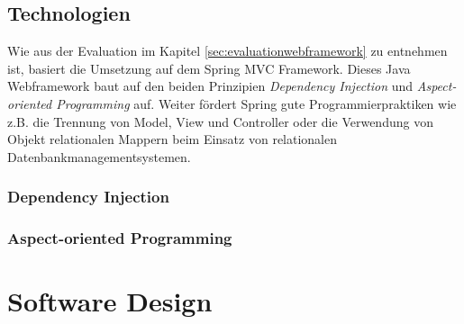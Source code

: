 \subsection{Technologien}
Wie aus der Evaluation im Kapitel \ref{sec:evaluationwebframework} zu entnehmen ist, basiert die Umsetzung auf dem Spring MVC Framework. Dieses Java Webframework baut auf den beiden Prinzipien \textit{Dependency Injection} und \textit{Aspect-oriented Programming} auf. Weiter fördert Spring gute Programmierpraktiken wie z.B. die Trennung von Model, View und Controller oder die Verwendung von Objekt relationalen Mappern beim Einsatz von relationalen Datenbankmanagementsystemen.

\subsubsection{Dependency Injection}

\subsubsection{Aspect-oriented Programming}



\section{Software Design}
